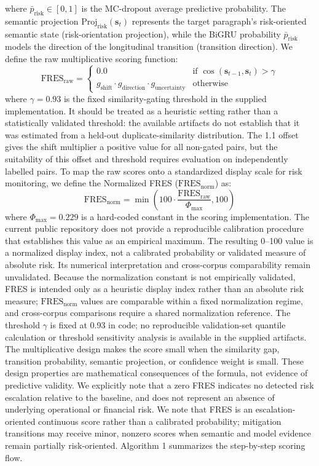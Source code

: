 \documentclass[pdflatex,sn-basic,Numbered]{sn-jnl}
\begin{document}
where $\bar{p}_{\text{risk}} \in [0, 1]$ is the MC-dropout average predictive probability. The semantic projection $\text{Proj}_{\text{risk}}(\mathbf{s}_t)$ represents the target paragraph's risk-oriented semantic state (risk-orientation projection), while the BiGRU probability $\bar{p}_{\text{risk}}$ models the direction of the longitudinal transition (transition direction). We define the raw multiplicative scoring function:
\begin{equation}
\text{FRES}_{\text{raw}} = \begin{cases} 
0.0 & \text{if } \cos(\mathbf{s}_{t-1}, \mathbf{s}_t) > \gamma \\
g_{\text{shift}} \cdot g_{\text{direction}} \cdot g_{\text{uncertainty}} & \text{otherwise}
\end{cases}
\end{equation}
where $\gamma = 0.93$ is the fixed similarity-gating threshold in the supplied implementation. It should be treated as a heuristic setting rather than a statistically validated threshold: the available artifacts do not establish that it was estimated from a held-out duplicate-similarity distribution. The 1.1 offset gives the shift multiplier a positive value for all non-gated pairs, but the suitability of this offset and threshold requires evaluation on independently labelled pairs. To map the raw scores onto a standardized display scale for risk monitoring, we define the Normalized FRES ($\text{FRES}_{\text{norm}}$) as:
\begin{equation}
\text{FRES}_{\text{norm}} = \min\left(100 \cdot \frac{\text{FRES}_{\text{raw}}}{\Phi_{\text{max}}}, 100\right)
\end{equation}
where $\Phi_{\text{max}} = 0.229$ is a hard-coded constant in the scoring implementation. The current public repository does not provide a reproducible calibration procedure that establishes this value as an empirical maximum. The resulting 0--100 value is a normalized display index, not a calibrated probability or validated measure of absolute risk. Its numerical interpretation and cross-corpus comparability remain unvalidated. Because the normalization constant is not empirically validated, FRES is intended only as a heuristic display index rather than an absolute risk measure; $\text{FRES}_{\text{norm}}$ values are comparable within a fixed normalization regime, and cross-corpus comparisons require a shared normalization reference. The threshold $\gamma$ is fixed at 0.93 in code; no reproducible validation-set quantile calculation or threshold sensitivity analysis is available in the supplied artifacts. The multiplicative design makes the score small when the similarity gap, transition probability, semantic projection, or confidence weight is small. These design properties are mathematical consequences of the formula, not evidence of predictive validity. We explicitly note that a zero FRES indicates no detected risk escalation relative to the baseline, and does not represent an absence of underlying operational or financial risk. We note that FRES is an escalation-oriented continuous score rather than a calibrated probability; mitigation transitions may receive minor, nonzero scores when semantic and model evidence remain partially risk-oriented. Algorithm 1 summarizes the step-by-step scoring flow.
\end{document}
